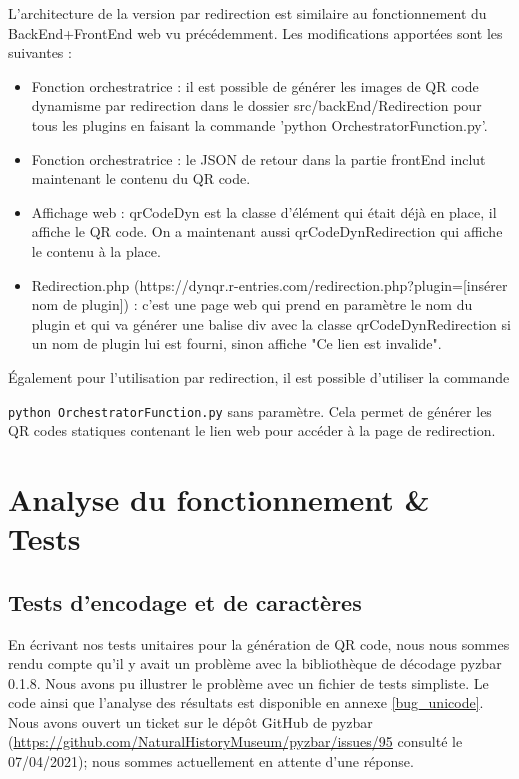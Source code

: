 \documentclass[a4paper,12pt]{article}
\begin{document}
\noindent L'architecture de la version par redirection est similaire au fonctionnement du BackEnd+FrontEnd web vu précédemment. Les modifications apportées sont les suivantes :\\ 
\begin{itemize}
    \item Fonction orchestratrice : il est possible de générer les images de QR code dynamisme par redirection dans le dossier src/backEnd/Redirection pour tous les plugins en faisant la commande 'python OrchestratorFunction.py'.
    \item Fonction orchestratrice : le JSON de retour dans la partie frontEnd inclut maintenant le contenu du QR code.
    \item Affichage web : qrCodeDyn est la classe d'élément qui était déjà en place, il affiche le QR code. On a maintenant aussi qrCodeDynRedirection qui affiche le contenu à la place.
    \item Redirection.php (https://dynqr.r-entries.com/redirection.php?plugin=[insérer nom de plugin]) : c'est une page web qui prend en paramètre le nom du plugin et qui va générer une balise div avec la classe qrCodeDynRedirection si un nom de plugin lui est fourni, sinon affiche "Ce lien est invalide".\\
\end{itemize}

\noindent Également pour l'utilisation par redirection, il est possible d'utiliser la commande 

\noindent \verb|python OrchestratorFunction.py| sans paramètre. Cela permet de générer les QR codes statiques contenant le lien web pour accéder à la page de redirection.
\\

\section{Analyse du fonctionnement \& Tests}

\subsection{Tests d'encodage et de caractères}

\noindent En écrivant nos tests unitaires pour la génération de QR code, nous nous sommes rendu compte qu'il y avait un problème avec la bibliothèque de décodage pyzbar 0.1.8. Nous avons pu illustrer le problème avec un fichier de tests simpliste. Le code ainsi que l'analyse des résultats est disponible en annexe \ref{bug_unicode}. Nous avons ouvert un ticket sur le dépôt GitHub de pyzbar (\url{https://github.com/NaturalHistoryMuseum/pyzbar/issues/95} consulté le 07/04/2021); nous sommes actuellement en attente d'une réponse.\\
\end{document}
